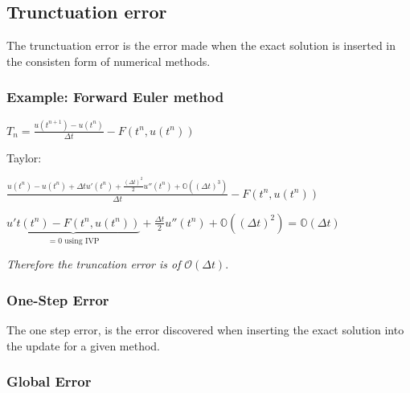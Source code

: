\documentclass[10pt,a4paper]{scrartcl}
\begin{document}
\begin{multicols*}{3}

\subsection{Trunctuation error}

The trunctuation error is the error made when the exact solution is inserted in the consisten form of numerical methods.

\subsubsection{Example: Forward Euler method}

$T_n=\frac{u(t^{n+1})-u(t^n)}{\Delta t}-F(t^n,u(t^n))$

Taylor:

$\frac{u(t^n)-u(t^n)+\Delta t u'(t^n)+\frac{(\Delta t)^2}{2}u''(t^n)+\mathbb{O}((\Delta t)^3)}{\Delta t}-F(t^n,u(t^n))$

$\underbrace{u't(t^n)-F(t^n,u(t^n))}_{=0 \text{ using IVP}}+\frac{\Delta t}{2}u''(t^n)+\mathbb{O}((\Delta t)^2)=\mathbb{O}(\Delta t)$

\finn

\emph{Therefore the truncation error is of} $\mathcal{O}(\Delta t)$.

\finn


\subsubsection{One-Step Error}

The one step error, is the error discovered when inserting the exact solution into the update for a given method.

\subsubsection{Global Error}




\end{multicols*}
\end{document}
